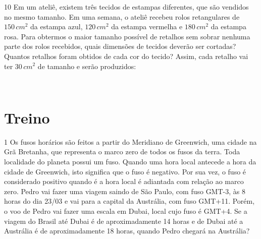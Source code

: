 

\num{10} Em um ateliê, existem três tecidos de estampas
diferentes, que são vendidos no mesmo tamanho. Em uma semana, o ateliê
recebeu rolos retangulares de $150\,cm^2$ da estampa azul, $120\,cm^2$ da
estampa vermelha e $180\,cm^2$ da estampa rosa. Para obtermos o maior
tamanho possível de retalhos sem sobrar nenhuma parte dos rolos
recebidos, quais dimensões de tecidos deverão ser cortadas? Quantos
retalhos foram obtidos de cada cor do tecido?
Assim, cada retalho vai ter $30\,cm^2$ de tamanho e serão produzidos:

\\

\section*{Treino}

\num{1} Os fusos horários são feitos a partir do Meridiano de Greenwich, uma
 cidade na Grã Bretanha, que representa o marco zero de todos os fusos da
 terra. Toda localidade do planeta possui um fuso. Quando uma hora local
 antecede a hora da cidade de Greenwich, isto significa que o fuso é
 negativo. Por sua vez, o fuso é considerado positivo quando é a hora local é
 adiantada com relação ao marco zero. Pedro vai fazer uma viagem saindo de
 São Paulo, com fuso GMT-3, às 8 horas do dia 23/03 e vai para a capital da
 Austrália, com fuso GMT+11. Porém, o voo de Pedro vai fazer uma escala em
 Dubai, local cujo fuso é GMT+4. Se a viagem do Brasil até Dubai é de
 aproximadamente 14 horas e de Dubai até a Austrália é de aproximadamente 18
 horas, quando Pedro chegará na Austrália?


